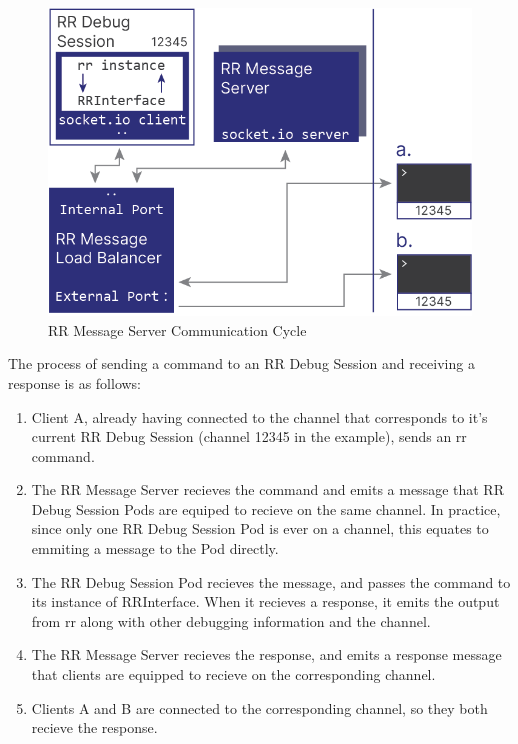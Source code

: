 \documentclass[12pt]{article}
\begin{document}
\begin{figure}[h!]

  \includegraphics[scale=1]{rr_detailed}
  \centering
  \caption{RR Message Server Communication Cycle}
  \label{rr:detailed}
\end{figure}

The process of sending a command to an RR Debug Session and receiving
a response is as follows:

\begin{enumerate}
\item Client A, already having connected to the channel that
  corresponds to it's current RR Debug Session (channel 12345 in the
  example), sends an rr command.
\item The RR Message Server recieves the command and emits a message
  that RR Debug Session Pods are equiped to recieve on the same
  channel.  In practice, since only one RR Debug Session Pod is ever
  on a channel, this equates to emmiting a message to the Pod
  directly.
\item The RR Debug Session Pod recieves the message, and passes the
  command to its instance of RRInterface.  When it recieves a
  response, it emits the output from rr along with other debugging
  information and the channel.
\item The RR Message Server recieves the response, and emits a
  response message that clients are equipped to recieve on the
  corresponding channel.
\item Clients A and B are connected to the corresponding channel, so
  they both recieve the response.
\end{enumerate}
\end{document}
